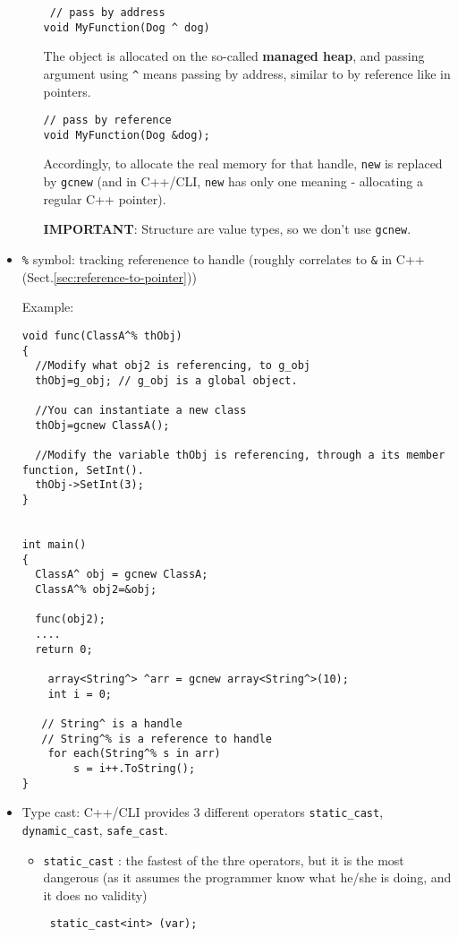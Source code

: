\begin{itemize}
\begin{enumerate}
\begin{verbatim}
 // pass by address
void MyFunction(Dog ^ dog)
\end{verbatim}

The object is allocated on the so-called {\bf managed heap}, and passing
argument using \verb!^! means passing by address, similar to by reference like
in pointers.
\begin{verbatim}
// pass by reference
void MyFunction(Dog &dog);
\end{verbatim}
  
Accordingly, to allocate the real memory for that handle, \verb!new! is replaced
by \verb!gcnew! (and in C++/CLI, \verb!new! has only one meaning - allocating a
regular C++ pointer).
  
{\bf IMPORTANT}: Structure are value types, so we don't use \verb!gcnew!. 
  
  \end{enumerate}

% 
%   
  

  \item \verb!%! symbol: tracking referenence to handle (roughly correlates to \verb!&! in C++ (Sect.\ref{sec:reference-to-pointer}))
  
Example:
\begin{verbatim}
void func(ClassA^% thObj)
{
  //Modify what obj2 is referencing, to g_obj
  thObj=g_obj; // g_obj is a global object.
  
  //You can instantiate a new class
  thObj=gcnew ClassA();
  
  //Modify the variable thObj is referencing, through a its member function, SetInt().
  thObj->SetInt(3);
}


int main()
{
  ClassA^ obj = gcnew ClassA;
  ClassA^% obj2=&obj;
  
  func(obj2);
  ....
  return 0;

    array<String^> ^arr = gcnew array<String^>(10);
    int i = 0;
 
   // String^ is a handle
   // String^% is a reference to handle
    for each(String^% s in arr)
        s = i++.ToString();
} 
\end{verbatim}
  
  

  \item Type cast: C++/CLI provides 3 different operators \verb!static_cast!,
  \verb!dynamic_cast!, \verb!safe_cast!.
  
  \begin{itemize}
    \item \verb!static_cast! : the fastest of the thre operators, but it is the
    most dangerous (as it assumes the programmer know what he/she is doing, and
    it does no validity)
 \begin{verbatim}
 static_cast<int> (var);
 

\end{verbatim}
\end{itemize}
\end{itemize}
